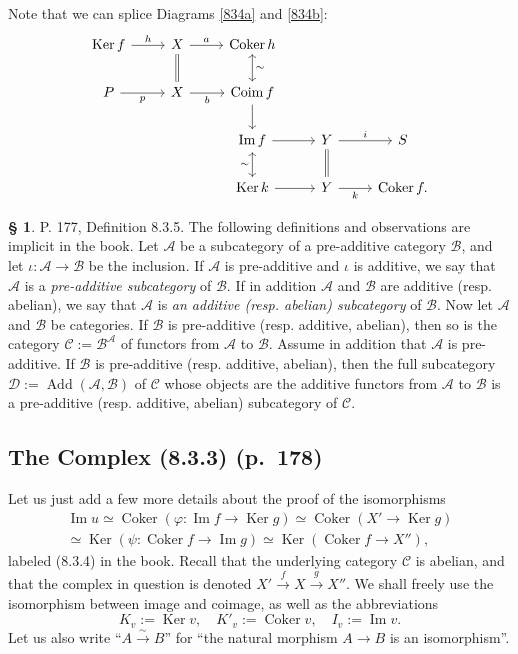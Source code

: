 \documentclass[12pt]{article}%
\theoremstyle{remark}
\theoremstyle{definition}
\newtheorem{s}[thm]{\S}%
\newcommand{\cc}{\mathcal}
\newcommand{\C}{\mathcal C}
\DeclareMathOperator{\Ad}{Add}
\DeclareMathOperator{\Coim}{Coim}
\DeclareMathOperator{\Coker}{Coker}
\DeclareMathOperator{\Ima}{Im}
\DeclareMathOperator{\Ker}{Ker}
\begin{document}
Note that we can splice Diagrams \eqref{834a} and \eqref{834b}:
$$
\begin{tikzcd}
\Ker f\ar{r}{h}&X\ar[equal]{d}\ar{r}{a}&\Coker h\ar[leftrightarrow]{d}{\sim}\\ 
P\ar{r}[swap]{p}&X\ar{r}[swap]{b}&\Coim f\ar{d}\\ 
{}&{}&\Ima f\ar[leftrightarrow]{d}[swap]{\sim}\ar{r}&Y\ar[equal]{d}\ar{r}{i}&S\\ 
{}&{}&\Ker k\ar{r}&Y\ar{r}[swap]{k}&\Coker f.
\end{tikzcd}
$$
%
%
\begin{s} 
P. 177, Definition 8.3.5. The following definitions and observations are implicit in the book. Let $\cc A$ be a subcategory of a pre-additive category $\cc B$, and let $\iota:\cc A\to \cc B$ be the inclusion. If $\cc A$ is pre-additive and $\iota$ is additive, we say that $\cc A$ is a {\em pre-additive subcategory} of $\cc B$. If in addition $\cc A$ and $\cc B$ are additive (resp. abelian), we say that $\cc A$ is {\em an additive (resp. abelian) subcategory} of $\cc B$. Now let $\cc A$ and $\cc B$ be categories. If $\cc B$ is pre-additive (resp. additive, abelian), then so is the category $\cc C:=\cc B^\cc A$ of functors from $\cc A$ to $\cc B$. Assume in addition that $\cc A$ is pre-additive. If $\cc B$ is pre-additive (resp. additive, abelian), then the full subcategory $\cc D:=\Ad(\cc A,\cc B)$ of $\cc C$ whose objects are the additive functors from $\cc A$ to $\cc B$ is a pre-additive (resp. additive, abelian) subcategory of $\cc C$.
\end{s}
%
\subsection{The Complex (8.3.3) (p.~178)}
%
Let us just add a few more details about the proof of the isomorphisms
\begin{equation}\label{834}
\begin{split}
\Ima u\simeq\Coker(\varphi:\Ima f\to\Ker g)\simeq\Coker(X'\to\Ker g)\\ 
\simeq\Ker(\psi:\Coker f\to\Ima g)\simeq\Ker(\Coker f\to X''),
\end{split}
\end{equation}
labeled (8.3.4) in the book. Recall that the underlying category $\C$ is abelian, and that the complex in question is denoted $X'\xrightarrow{f}X\xrightarrow{g}X''$. We shall freely use the isomorphism between image and coimage, as well as the abbreviations 
$$
K_v:=\Ker v,\quad K'_v:=\Coker v,\quad I_v:=\Ima v.
$$ 
Let us also write ``$A\overset{\sim}{\to}B$'' for ``the natural morphism $A\to B$ is an isomorphism''. 
\end{document}
